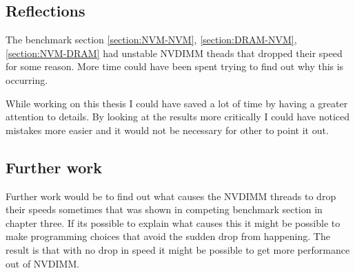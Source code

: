 \documentclass[12pt,a4paper,USenglish]{article}      %
\begin{document}
\subsection{Reflections}
The benchmark section \ref{section:NVM-NVM}, \ref{section:DRAM-NVM}, \ref{section:NVM-DRAM} had unstable NVDIMM theads that dropped their speed for some reason. More time could have been spent trying to find out why this is occurring.

While working on this thesis I could have saved a lot of time by having a greater attention to details. By looking at the results more critically I could have noticed mistakes more easier and it would not be necessary for other to point it out. 

\subsection{Further work}
Further work would be to find out what causes the NVDIMM threads to drop their speeds sometimes that was shown in competing benchmark section in chapter three.
If its possible to explain what causes this it might be possible to make programming choices that avoid the sudden drop from happening. The result is that with no drop in speed it might be possible to get more performance out of NVDIMM.



\begin{comment}
Chapter 3 are about the benchmarks that have created for this thesis and a Stream benchmark that has been created by someone else. The Stream benchmark tested the speed of DRAM when only DRAM was working. There was also created a modified version of the Stream benchmark that measured the speed of NVDIMM when only NVDIMM was working. The section moved on to test DRAM and NVDIMM when they were competing for resources. There are three benchmarks. While a group of threads transferred from DRAM-DRAM another group of thread are transferring data from either NVDIMM-NVDIMM, DRAM-NVDIMM or NVDIMM-DRAM. All possible combinations of threads were tested and there was only one thread per core.

How much data should be allocated to NVDIMM and how many threads should be working on the data. There are two version of this program and the difference between versions are about how NVDIMM and DRAM access data that belong in the other group. 
\end{comment}
\end{document}
